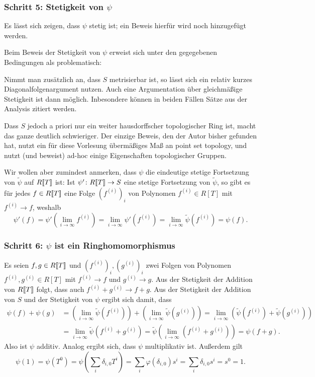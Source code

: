 \documentclass[a4paper, 10pt, numbers=noenddot]{scrartcl}
\begin{document}
\subsubsection*{Schritt 5: Stetigkeit von $\psi$}
Es lässt sich zeigen, dass $\psi$ stetig ist;
ein Beweis hierfür wird noch hinzugefügt werden.

\begin{remark}
  Beim Beweis der Stetigkeit von $\psi$ erweist sich unter den gegegebenen Bedingungen als problematisch:
  
  Nimmt man zusätzlich an, dass $S$ metrisierbar ist, so lässt sich ein relativ kurzes Diagonalfolgenargument nutzen.
  Auch eine Argumentation über gleichmäßige Stetigkeit ist dann möglich.
  Inbesondere können in beiden Fällen Sätze aus der Analysis zitiert werden.
  
  Dass $S$ jedoch a priori nur ein weiter hausdorffscher topologischer Ring ist, macht das ganze deutlich schwieriger.
  Der einzige Beweis, den der Autor bisher gefunden hat, nutzt ein für diese Vorlesung übermäßiges Maß an point set topology, und nutzt (und beweist) ad-hoc einige Eigenschaften topologischer Gruppen.
\end{remark}

Wir wollen aber zumindest anmerken, dass $\psi$ die eindeutige stetige Fortsetzung von $\tilde{\psi}$ auf $R[\![T]\!]$ ist:
Ist $\psi' \colon R[\![T]\!] \to S$ eine stetige Fortsetzung von $\tilde{\psi}$, so gibt es für jedes $f \in R[\![T]\!]$ eine Folge $(f^{(i)})_i$ von Polynomen $f^{(i)} \in R[T]$ mit $f^{(i)} \to f$, weshalb
\[
    \psi'(f)
  = \psi'\left( \lim_{i \to \infty} f^{(i)} \right)
  = \lim_{i \to \infty} \psi'\left( f^{(i)} \right)
  = \lim_{i \to \infty} \tilde{\psi}\left( f^{(i)} \right)
  = \psi(f).
\]


\subsubsection*{Schritt 6: $\psi$ ist ein Ringhomomorphismus}
Es seien $f, g \in R[\![T]\!]$ und $(f^{(i)})_i, (g^{(i)})_i$ zwei Folgen von Polynomen $f^{(i)}, g^{(i)} \in R[T]$ mit $f^{(i)} \to f$ und $g^{(i)} \to g$.
Aus der Stetigkeit der Addition von $R[\![T]\!]$ folgt, dass auch $f^{(i)} + g^{(i)} \to f + g$.
Aus der Stetigkeit der Addition von $S$ und der Stetigkeit von $\psi$ ergibt sich damit, dass
\begin{align*}
        \psi(f) + \psi(g)
  &=    \left( \lim_{i \to \infty} \tilde{\psi}\left( f^{(i)} \right) \right)
      + \left( \lim_{i \to \infty} \tilde{\psi}\left( g^{(i)} \right) \right)
   =  \lim_{i \to \infty} \left( \tilde{\psi}\left( f^{(i)} \right) + \tilde{\psi}\left( g^{(i)} \right) \right)
  \\
  &=  \lim_{i \to \infty} \tilde{\psi}\left( f^{(i)} + g^{(i)} \right)
   =  \tilde{\psi}\left( \lim_{i \to \infty} \left( f^{(i)} + g^{(i)} \right) \right)
   =  \psi(f + g).
\end{align*}
Also ist $\psi$ additiv.
Analog ergibt sich, dass $\psi$ multiplikativ ist.
Außerdem gilt
\[
    \psi(1)
  = \psi\left( T^0 \right)
  = \psi\left( \sum_i \delta_{i,0} T^i \right)
  = \sum_i \varphi(\delta_{i,0}) s^i
  = \sum_i \delta_{i,0} s^i
  = s^0
  = 1.
\]
\end{document}
